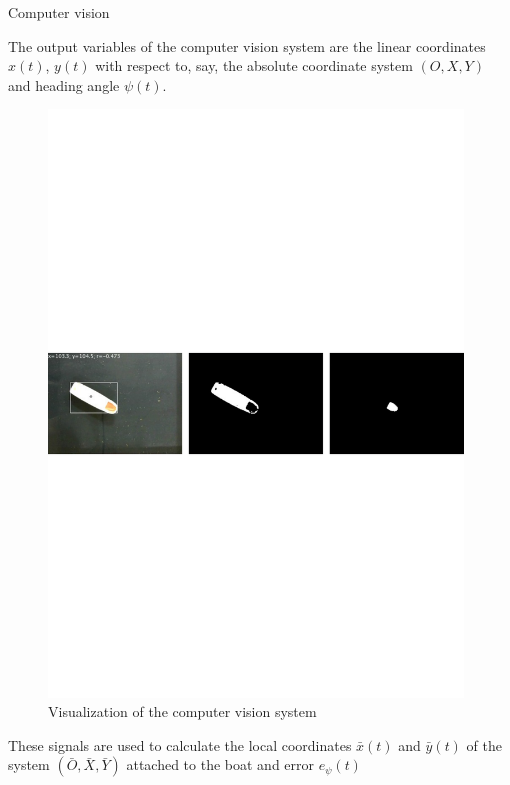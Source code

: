 \documentclass[10pt,pdf,hyperref={unicode}]{beamer}
\begin{document}
\begin{frame}{Computer vision}

The output variables of the computer vision system are the linear coordinates $x(t)$, $y(t)$ with respect to, say, the absolute coordinate system $(O,X,Y)$ and heading angle $\psi(t)$.

	\begin{figure}[b]
		\centering
		\includegraphics[width=11cm]{computer_vision}
		\caption{Visualization of the computer vision system}
		\label{computer_vision}
	\end{figure}

These signals are used to calculate the local coordinates $\bar x(t)$ and $\bar y(t)$ of the system $(\bar O,\bar X,\bar Y)$ attached to the boat and error $e_\psi(t)$ 

\end{frame}
\end{document}
